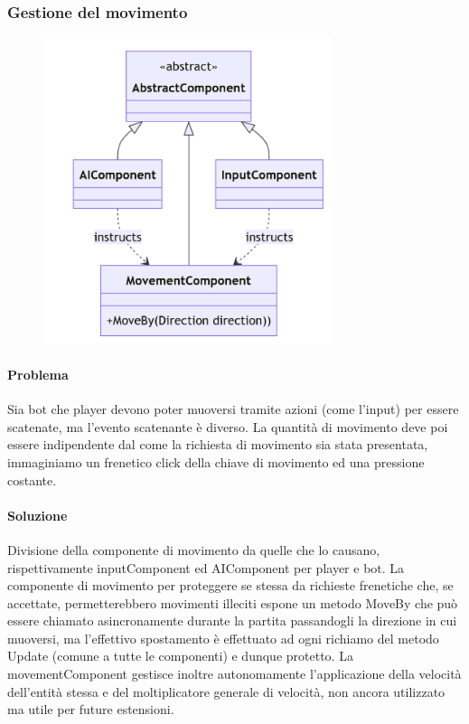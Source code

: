 \documentclass[a4paper,12pt]{report}
\begin{document}
%
\subsubsection*{Gestione del movimento}
%
\begin{figure}[H]
    \centering{}
    \includegraphics[width=0.75\textwidth]{img/UMLMovement.png}
    \caption{}
\end{figure}
%
\paragraph*{Problema} Sia bot che player devono poter muoversi tramite azioni (come l’input) per essere scatenate, ma l’evento scatenante è diverso.
La quantità di movimento deve poi essere indipendente dal come la richiesta di movimento sia stata presentata, immaginiamo un frenetico click della chiave di movimento ed una pressione costante.

%
\paragraph*{Soluzione} Divisione della componente di movimento da quelle che lo causano, rispettivamente inputComponent ed AIComponent per player e bot.
La componente di movimento per proteggere se stessa da richieste frenetiche che, se accettate, permetterebbero movimenti illeciti espone un metodo MoveBy che può essere chiamato asincronamente durante la partita passandogli la direzione in cui muoversi, ma l’effettivo spostamento è effettuato ad ogni richiamo del metodo Update (comune a tutte le componenti) e dunque protetto.
La movementComponent gestisce inoltre autonomamente l’applicazione della velocità dell’entità stessa e del moltiplicatore generale di velocità, non ancora utilizzato ma utile per future estensioni.
\end{document}

